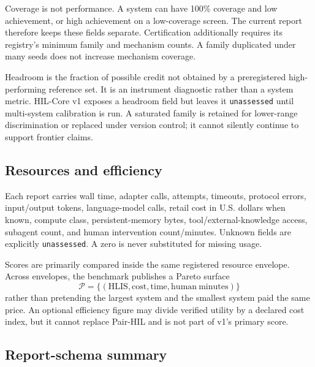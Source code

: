 \documentclass[11pt]{article}
\theoremstyle{definition}
\newcommand{\HLIS}{\ensuremath{\mathrm{HLIS}}}
\begin{document}
Coverage is not performance. A system can have 100\% coverage and low achievement, or high achievement on a low-coverage screen. The current report therefore keeps these fields separate. Certification additionally requires its registry's minimum family and mechanism counts. A family duplicated under many seeds does not increase mechanism coverage.

Headroom is the fraction of possible credit not obtained by a preregistered high-performing reference set. It is an instrument diagnostic rather than a system metric. HIL-Core v1 exposes a headroom field but leaves it \texttt{unassessed} until multi-system calibration is run. A saturated family is retained for lower-range discrimination or replaced under version control; it cannot silently continue to support frontier claims.

\subsection{Resources and efficiency}

Each report carries wall time, adapter calls, attempts, timeouts, protocol errors, input/output tokens, language-model calls, retail cost in U.S. dollars when known, compute class, persistent-memory bytes, tool/external-knowledge access, subagent count, and human intervention count/minutes. Unknown fields are explicitly \texttt{unassessed}. A zero is never substituted for missing usage.

Scores are primarily compared inside the same registered resource envelope. Across envelopes, the benchmark publishes a Pareto surface
\begin{equation}
\mathcal{P}=\{(\HLIS,\mathrm{cost},\mathrm{time},\mathrm{human\ minutes})\}
\end{equation}
rather than pretending the largest system and the smallest system paid the same price. An optional efficiency figure may divide verified utility by a declared cost index, but it cannot replace Pair-HIL and is not part of v1's primary score.

\subsection{Report-schema summary}
\end{document}
